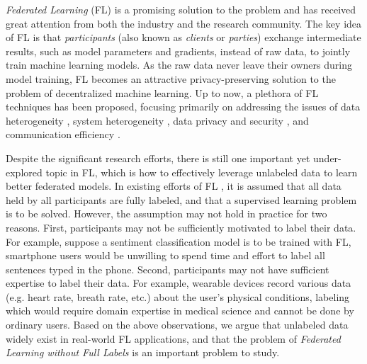 \documentclass[11pt]{article}
\begin{document}
\textit{Federated Learning} (FL) \cite{yang2019federated,kairouz2021advances} is a promising solution to the problem and has received great attention from both the industry and the research community. The key idea of FL is that \textit{participants} (also known as \textit{clients} or \textit{parties}) exchange intermediate results, such as model parameters and gradients, instead of raw data, to jointly train machine learning models. As the raw data never leave their owners during model training, FL becomes an attractive privacy-preserving solution to the problem of decentralized machine learning. Up to now, a plethora of FL techniques has been proposed, focusing primarily on addressing the issues of data heterogeneity \cite{li2020federated,karimireddy2020scaffold}, system heterogeneity \cite{lai2021oort,diao2021heterofl}, data privacy and security \cite{bonawitz2017practical,zhang2020batchcrypt}, and communication efficiency \cite{mcmahan2017communication,reisizadeh2020fedpaq}. 

Despite the significant research efforts, there is still one important yet under-explored topic in FL, which is how to effectively leverage unlabeled data to learn better federated models. In existing efforts of FL \cite{mcmahan2017communication,li2020federated,lai2021oort}, it is assumed that all data held by all participants are fully labeled, and that a supervised learning problem is to be solved. However, the assumption may not hold in practice for two reasons. First, participants may not be sufficiently motivated to label their data. For example, suppose a sentiment classification model is to be trained with FL, smartphone users would be unwilling to spend time and effort to label all sentences typed in the phone. Second, participants may not have sufficient expertise to label their data. For example, wearable devices record various data (e.g. heart rate, breath rate, etc.) about the user's physical conditions, labeling which would require domain expertise in medical science and cannot be done by ordinary users. Based on the above observations, we argue that unlabeled data widely exist in real-world FL applications, and that the problem of \textit{Federated Learning without Full Labels} is an important problem to study. 
\end{document}
